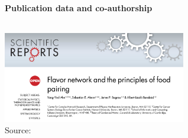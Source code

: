 \documentclass[8pt]{beamer}
\begin{document}

\begin{frame}
\frametitle{\insertsection}
\framesubtitle{Publication data and co-authorship}

\begin{columns}[c]



\centering
\includegraphics[width=8cm, frame]{paper_collaboration}\\     
\tiny{Source: \cite{Ahn2011}}

\end{columns}

\end{frame}

\end{document}
